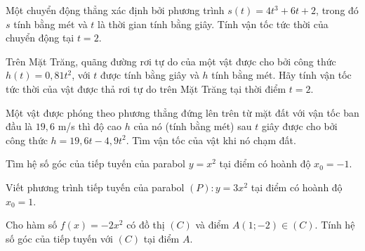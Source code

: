 \begin{bt}%
	Một chuyển động thẳng xác định bởi phương trình $s(t)=4 t^3+6 t+2$, trong đó $s$ tính bằng mét và $t$ là thời gian tính bằng giây. Tính vận tốc tức thời của chuyển động tại $t=2$.
\end{bt}
\begin{bt}%
	Trên Mặt Trăng, quãng đường rơi tự do của một vật được cho bởi công thức $h(t)=0,81 t^2$, với $t$ được tính bằng giây và $h$ tính bằng mét. Hãy tính vận tốc tức thời của vật được thả rơi tự do trên Mặt Trăng tại thời điểm $t=2$.
\end{bt}
\begin{bt}%
	Một vật được phóng theo phương thẳng đứng lên trên từ mặt đất với vận tốc ban đầu là $19{,}6$ m/s thì độ cao $h$ của nó (tính bằng mét) sau $t$ giây được cho bởi công thức $h=19{,}6t-4{,}9t^2$. Tìm vận tốc của vật khi nó chạm đất.
\end{bt}
\begin{bt}%
	Tìm hệ số góc của tiếp tuyến của parabol $y=x^2$ tại điểm có hoành độ $x_0=-1$.
\end{bt}
\begin{bt}%
	Viết phương trình tiếp tuyến của parabol $(P)\colon y=3x^2$ tại điểm có hoành độ $x_0=1$.
\end{bt}	
\begin{bt}%
	Cho hàm số $f(x)=-2 x^2$ có đồ thị $(C)$ và điểm $A(1 ;-2) \in(C)$. Tính hệ số góc của tiếp tuyến với $(C)$ tại điểm $A$.
\end{bt}
